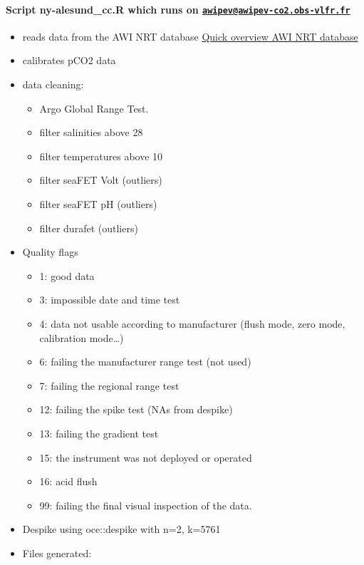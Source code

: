 \documentclass[
]{article}
\providecommand{\tightlist}{%
  \setlength{\itemsep}{0pt}\setlength{\parskip}{0pt}}
\begin{document}
\hypertarget{script-ny-alesund_cc.r-which-runs-on-awipevawipev-co2.obs-vlfr.fr}{%
\paragraph{\texorpdfstring{Script ny-alesund\_cc.R which runs on
\href{mailto:awipev@awipev-co2.obs-vlfr.fr}{\nolinkurl{awipev@awipev-co2.obs-vlfr.fr}}}{Script ny-alesund\_cc.R which runs on awipev@awipev-co2.obs-vlfr.fr}}\label{script-ny-alesund_cc.r-which-runs-on-awipevawipev-co2.obs-vlfr.fr}}

\begin{itemize}
\tightlist
\item
  reads data from the AWI NRT database
  \href{https://dashboard.awi.de/?dashboard=9736}{Quick overview AWI NRT
  database}
\item
  calibrates pCO2 data
\item
  data cleaning:

  \begin{itemize}
  \tightlist
  \item
    Argo Global Range Test.
  \item
    filter salinities above 28
  \item
    filter temperatures above 10
  \item
    filter seaFET Volt (outliers)
  \item
    filter seaFET pH (outliers)
  \item
    filter durafet (outliers)
  \end{itemize}
\item
  Quality flags

  \begin{itemize}
  \tightlist
  \item
    1: good data
  \item
    3: impossible date and time test
  \item
    4: data not usable according to manufacturer (flush mode, zero mode,
    calibration mode\ldots)
  \item
    6: failing the manufacturer range test (not used)
  \item
    7: failing the regional range test
  \item
    12: failing the spike test (NAs from despike)
  \item
    13: failing the gradient test
  \item
    15: the instrument was not deployed or operated
  \item
    16: acid flush
  \item
    99: failing the final visual inspection of the data.
  \end{itemize}
\item
  Despike using oce::despike with n=2, k=5761
\item
  Files generated:


\end{itemize}
\end{document}
